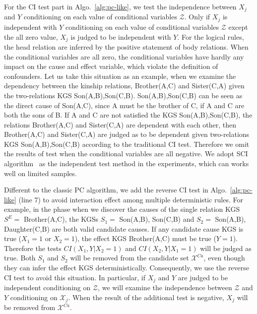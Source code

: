 For the CI test part in Algo.~\ref{alg:pc-like}, we test the independence between $X_j$ and $Y$ conditioning on each value of conditional variables $\mathcal{Z}$.
Only if $X_j$ is independent with $Y$ conditioning on each value of conditional variables $\mathcal{Z}$ except the all zero value, $X_j$ is judged to be independent with $Y$.
For the logical rules, the head relation are inferred by the positive statement of body relations.
When the conditional variables are all zero, the conditional variables have hardly any impact on the cause and effect variable, which violate the definition of confounders.
Let us take this situation as an example, when we examine the dependency between the kinship relations, Brother(A,C) and Sister(C,A) given the two-relations KGS Son(A,B),Son(C,B). Son(A,B),Son(C,B) can be seen as the direct cause of Son(A,C), since A must be the brother of C, if A and C are both the sons of B.
If A and C are not satisfied the KGS Son(A,B),Son(C,B), the relations Brother(A,C) and Sister(C,A) are dependent with each other, then Brother(A,C) and Sister(C,A) are judged as to be dependent given two-relations KGS Son(A,B),Son(C,B) according to the traditional CI test.
Therefore we omit the results of test when the conditional variables are all negative.
We adopt SCI algorithm~\cite{marx2019testing} as the independent test method in the experiments, which can works well on limited samples.

Different to the classic PC algorithm, we add the reverse CI test in Algo.~\ref{alg:pc-like} (line 7) to avoid interaction effect among multiple deterministic rules.
For example, in the phase when we discover the causes of the single relation KGS $S^E=$ Brother(A,C), the KGSs $S_1=$ Son(A,B), Son(C,B) and $S_2=$ Son(A,B), Daughter(C,B) are both valid candidate causes.
If any candidate cause KGS is true ($X_1=1$ or $X_2=1$), the effect KGS Brother(A,C) must be true ($Y=1$).
Therefore the tests $CI(X_1, Y|X_2=1)$ and $CI(X_2, Y|X_1=1)$ will be judged as true.
Both $S_1$ and $S_2$ will be removed from the candidate set $\mathcal{X}^{Ca}$, even though they can infer the effect KGS deterministically.
Consequently, we use the reverse CI test to avoid this situation.
In particular, if $X_j$ and $Y$ are judged to be independent conditioning on $\mathcal{Z}$, we will examine the independence between $\mathcal{Z}$ and $Y$ conditioning on $\mathcal{X}_j$.
When the result of the additional test is negative, $X_j$ will be removed from $\mathcal{X}^{Ca}$. 
